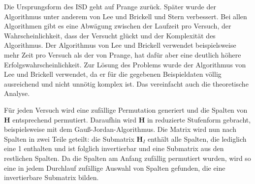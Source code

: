 \documentclass[a4paper,10pt,ngerman]{scrartcl}
\begin{document}
Die Ursprungsform des ISD geht auf Prange \cite{prangeUseInformationSets1962} zurück.
Später wurde der Algorithmus unter anderem von Lee und Brickell \cite{leeObservationSecurityMcEliece1988} und Stern \cite{sternMethodFindingCodewords1989} verbessert. 
Bei allen Algorithmen gibt es eine Abwägung zwischen der Laufzeit pro Versuch, der Wahrscheinlichkeit, dass der Versucht glückt und der Komplexität des Algorithmus. Der Algorithmus von Lee und Brickell verwendet beispielsweise mehr Zeit pro Versuch als der von Prange, hat dafür aber eine deutlich höhere Erfolgswahrscheinlichkeit. 
Zur Lösung des Problems wurde der Algorithmus von Lee und Brickell verwendet, da er für die gegebenen Beispieldaten völlig ausreichend und nicht unnötig komplex ist. Das vereinfacht auch die theoretische Analyse. 
Für jeden Versuch wird eine zufällige Permutation generiert und die Spalten von $\mathbf{H}$ entsprechend permutiert. Daraufhin wird $\mathbf{H}$ in reduzierte Stufenform gebracht, beispielsweise mit dem Gauß-Jordan-Algorithmus.
Die Matrix wird nun nach Spalten in zwei Teile geteilt: die Submatrix $\mathbf{H}_I$ enthält alle Spalten, die lediglich eine 1 enthalten und ist folglich invertierbar und eine Submatrix aus den restlichen Spalten. 
Da die Spalten am Anfang zufällig permutiert wurden, wird so eine in jedem Durchlauf zufällige Auswahl von Spalten gefunden, die eine invertierbare Submatrix bilden. 
\end{document}
